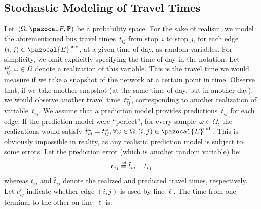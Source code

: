 \documentclass[a4paper,fleqn]{cas-sc}
\newcommand{\defeq}{\stackrel{\scalebox{0.5}{\ensuremath{\mathsf{\,def}}}}{=}}
\begin{document}
\subsection{Stochastic Modeling of Travel Times}
\label{sec:Stochastic-Modeling-of-Travel-Times}
Let~$(\Omega,\pazocal F,\mathbb P)$ be a probability space. 
For the sake of realism, we model the aforementioned bus travel times~$t_{ij}$ from stop~$i$ to stop $j$, for each edge $(i,j)\in\pazocal{E}^{\text{sub}}$, at a given time of day, as random variables. For simplicity, we omit explicitly specifying the time of day in the notation. Let~$t_{ij}^\omega, \omega\in\Omega$ denote a realization of this variable. 
%
This is the travel time we would measure if we take a snapshot of the network at a certain point in time. Observe that, if we take another snapshot (at the same time of day, but in another day), we would observe another travel time~$t_{ij}^{\omega'}$, corresponding to another realization of variable~$t_{ij}$.
We assume that a prediction model provides predictions~$\hat t_{ij}$ for each edge.
%
If the prediction model were ``perfect'', for every sample~$\omega\in\Omega$, the realizations would satisfy $\hat t_{ij}^\omega = t_{ij}^\omega, \forall \omega\in\Omega,(i,j)\in\pazocal{E}^{\text{sub}}$. This is obviously impossible in reality, as any realistic prediction model is subject to some errors. Let the prediction error (which is another random variable) be:
%
\begin{equation}
\epsilon_{ij} \defeq \hat t_{ij}-t_{ij}\label{eq:link_time_error}
\end{equation}
%
whereas $t_{ij}$ and $\hat t_{ij}$ denote the realized and predicted travel times, respectively. 
%
Let $e_{ij}^\ell$ indicate whether edge $(i,j)$ is used by line $\ell$. 
%
The time from one terminal to the other on line~$\ell$ is: 
\end{document}
